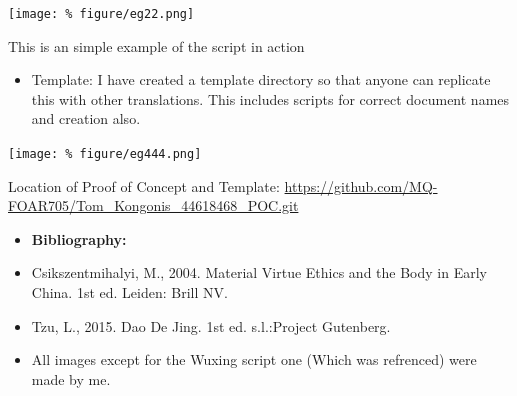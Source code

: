 \documentclass[unknownkeysallowed,usepdftitle=false, aspectratio=169, parskip=full]{beamer}
\newcommand{\secvariable}{nothing}
\newcommand{\mysection}[1]{\renewcommand{\secvariable}{#1}
}
\begin{document}
\mysection{major}
\begin{frame}\label{\secvariable} %
\begin{center}
\texttt{[image: \%
figure/eg22.png]}
\end{center}
This is an simple example of the script in action
\end{frame}

\mysection{slab}
\begin{frame}\label{\secvariable}

   \begin{flushleft}
   \parbox{\linewidth}{
\begin{itemize}
\item{Template: I have created a template directory so that anyone can replicate this with other translations. This includes scripts for correct document names and creation also.} 
\end{itemize}
}
\begin{flushright}
\texttt{[image: \%
figure/eg444.png]}
\end{flushright}
\end{flushleft}
\end{frame}








\mysection{minor}



\begin{frame}\label{\secvariable}

%

Location of Proof of Concept and Template: \url{https://github.com/MQ-FOAR705/Tom_Kongonis_44618468_POC.git}

\vspace{5mm}

\begin{itemize}
\item{\textbf{Bibliography:}}
\item{Csikszentmihalyi, M., 2004. Material Virtue Ethics and the Body in Early China. 1st ed. Leiden: Brill NV.}

\item{Tzu, L., 2015. Dao De Jing. 1st ed. s.l.:Project Gutenberg.}
\item{All images except for the Wuxing script one (Which was refrenced) were made by me.}
\end{itemize}

\end{frame}

\mysection{conclusion}
\end{document}
